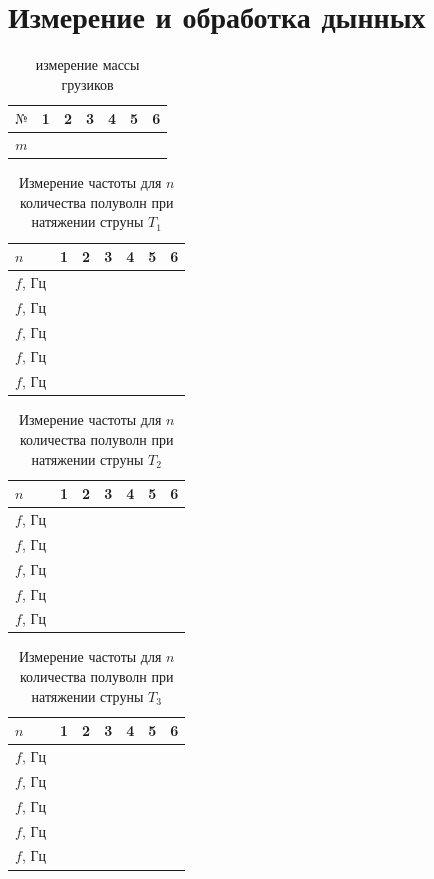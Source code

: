 \documentclass[a4paper,12pt]{article} %
\begin{document}
\section{Измерение и обработка дынных}
\begin{table}[h]
\centering
\begin{tabular}{|c|p{1.5cm}|p{1.5cm}|p{1.5cm}|p{1.5cm}|p{1.5cm}|p{1.5cm}|}

\hline
$\text{№}$ & 1 & 2 & 3 & 4 & 5 & 6\\ \hline
$m$ & & & & & & \\ \hline
\end{tabular}
\caption{измерение массы грузиков}
\end{table}

\begin{table}[h]
\centering
\begin{tabular}{|p{1cm}|p{1cm}|p{1cm}|p{1cm}|p{1cm}|p{1cm}|p{1cm}|}

\hline
$n$ & 1 & 2 & 3 & 4 & 5 & 6\\ \hline
$f$, Гц & & & & & &\\ \hline
$f$, Гц & & & & & &\\ \hline
$f$, Гц & & & & & &\\ \hline
$f$, Гц & & & & & &\\ \hline
$f$, Гц & & & & & &\\ \hline
\end{tabular}
\caption{Измерение частоты для $n$ количества полуволн при натяжении струны $T_1$}
\end{table}
\begin{table}[h]
\centering
\begin{tabular}{|p{1cm}|p{1cm}|p{1cm}|p{1cm}|p{1cm}|p{1cm}|p{1cm}|}

\hline
$n$ & 1 & 2 & 3 & 4 & 5 & 6\\ \hline
$f$, Гц & & & & & &\\ \hline
$f$, Гц & & & & & &\\ \hline
$f$, Гц & & & & & &\\ \hline
$f$, Гц & & & & & &\\ \hline
$f$, Гц & & & & & &\\ \hline
\end{tabular}
\caption{Измерение частоты для $n$ количества полуволн при натяжении струны $T_2$}
\end{table}
\begin{table}[h]
\centering
\begin{tabular}{|p{1cm}|p{1cm}|p{1cm}|p{1cm}|p{1cm}|p{1cm}|p{1cm}|}

\hline
$n$ & 1 & 2 & 3 & 4 & 5 & 6\\ \hline
$f$, Гц & & & & & &\\ \hline
$f$, Гц & & & & & &\\ \hline
$f$, Гц & & & & & &\\ \hline
$f$, Гц & & & & & &\\ \hline
$f$, Гц & & & & & &\\ \hline
\end{tabular}
\caption{Измерение частоты для $n$ количества полуволн при натяжении струны $T_3$}
\end{table}
\end{document}
